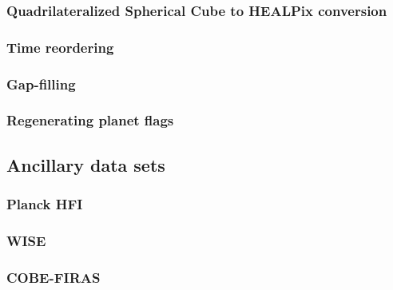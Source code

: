 \documentclass{aa}
\begin{document}
\subsubsection{Quadrilateralized Spherical Cube to HEALPix conversion}
\subsubsection{Time reordering}
\subsubsection{Gap-filling}
\subsubsection{Regenerating planet flags}

\subsection{Ancillary data sets}

\subsubsection{Planck HFI}

\subsubsection{WISE}

\subsubsection{COBE-FIRAS}





\clearpage
\end{document}
